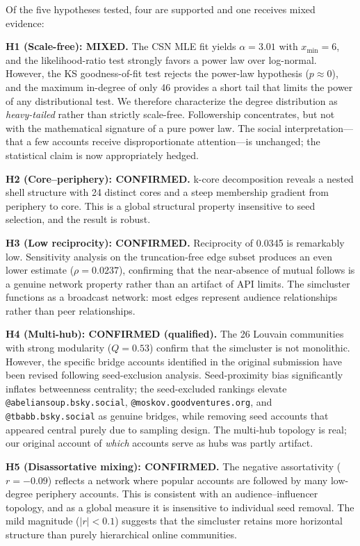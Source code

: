 \documentclass[11pt,a4paper]{article}
\begin{document}
Of the five hypotheses tested, four are supported and one receives mixed evidence:

\textbf{H1 (Scale-free): MIXED.} The CSN MLE fit yields $\alpha = 3.01$ with $x_{\min}=6$, and the likelihood-ratio test strongly favors a power law over log-normal. However, the KS goodness-of-fit test rejects the power-law hypothesis ($p \approx 0$), and the maximum in-degree of only 46 provides a short tail that limits the power of any distributional test. We therefore characterize the degree distribution as \textit{heavy-tailed} rather than strictly scale-free. Followership concentrates, but not with the mathematical signature of a pure power law. The social interpretation---that a few accounts receive disproportionate attention---is unchanged; the statistical claim is now appropriately hedged.

\textbf{H2 (Core--periphery): CONFIRMED.} k-core decomposition reveals a nested shell structure with 24 distinct cores and a steep membership gradient from periphery to core. This is a global structural property insensitive to seed selection, and the result is robust.

\textbf{H3 (Low reciprocity): CONFIRMED.} Reciprocity of 0.0345 is remarkably low. Sensitivity analysis on the truncation-free edge subset produces an even lower estimate ($\rho = 0.0237$), confirming that the near-absence of mutual follows is a genuine network property rather than an artifact of API limits. The simcluster functions as a broadcast network: most edges represent audience relationships rather than peer relationships.

\textbf{H4 (Multi-hub): CONFIRMED (qualified).} The 26 Louvain communities with strong modularity ($Q = 0.53$) confirm that the simcluster is not monolithic. However, the specific bridge accounts identified in the original submission have been revised following seed-exclusion analysis. Seed-proximity bias significantly inflates betweenness centrality; the seed-excluded rankings elevate \texttt{@abeliansoup.bsky.social}, \texttt{@moskov.goodventures.org}, and \texttt{@tbabb.bsky.social} as genuine bridges, while removing seed accounts that appeared central purely due to sampling design. The multi-hub topology is real; our original account of \textit{which} accounts serve as hubs was partly artifact.

\textbf{H5 (Disassortative mixing): CONFIRMED.} The negative assortativity ($r = -0.09$) reflects a network where popular accounts are followed by many low-degree periphery accounts. This is consistent with an audience--influencer topology, and as a global measure it is insensitive to individual seed removal. The mild magnitude ($|r| < 0.1$) suggests that the simcluster retains more horizontal structure than purely hierarchical online communities.
\end{document}
